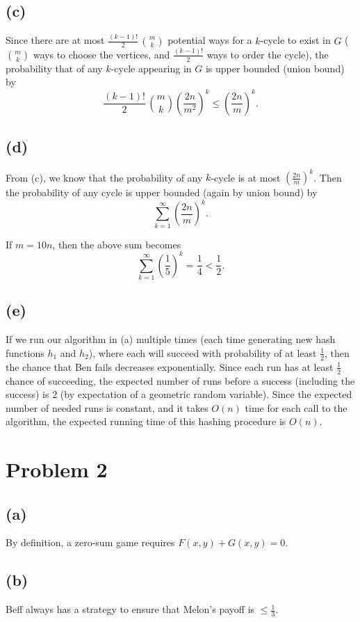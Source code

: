 \documentclass{6046}
\begin{document}
\subsection*{(c)}

Since there are at most $\frac{(k - 1)!}{2}\,\binom{m}{k}$ potential ways
for a $k$-cycle to exist in $G$ ($\binom{m}{k}$ ways to choose
the vertices, and $\frac{(k - 1)!}{2}$ ways to order the cycle), the probability that
of any $k$-cycle appearing in $G$ is upper bounded (union bound) by 
$$\frac{(k - 1)!}{2}\,\binom{m}{k}\left(\frac{2n}{m^2}\right)^k \le
\left(\frac{2n}{m}\right)^k.$$

\subsection*{(d)}

From (c), we know that the probability of any $k$-cycle is
at most $(\frac{2n}{m})^k$. Then the probability of
any cycle is upper bounded (again by union bound) by
$$\sum_{k = 1}^{\infty} \left(\frac{2n}{m}\right)^k.$$

If $m = 10n$, then the above sum becomes
$$\sum_{k = 1}^{\infty} \left(\frac{1}{5}\right)^k
= \frac{1}{4} < \frac{1}{2}.$$

\subsection*{(e)}
If we run our algorithm in (a) multiple times (each time
generating new hash functions $h_1$ and $h_2$), where each
will succeed with probability of at least $\frac{1}{2}$, then
the chance that Ben fails decreases exponentially. Since
each run has at least $\frac{1}{2}$ chance of succeeding,
the expected number of runs before a success (including
the success) is $2$ (by expectation of a geometric
random variable). Since the expected number of needed runs is
constant, and it takes $O(n)$ time for each call to the
algorithm, the expected running time of this hashing
procedure is $O(n)$.

\section*{Problem 2}
\subsection*{(a)}
By definition, a zero-sum game requires
$F(x, y) + G(x, y) = 0$.

\subsection*{(b)}
Beff always has a strategy to ensure that Melon's payoff is
$\le \frac{1}{3}$.
\end{document}
